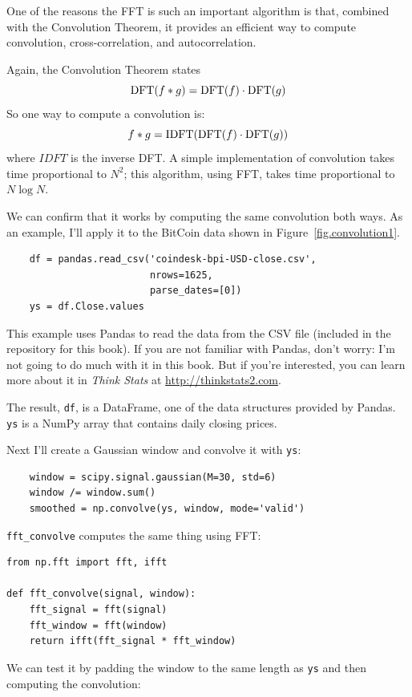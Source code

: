 \documentclass[12pt]{book}
\begin{document}
One of the reasons the FFT is such an important algorithm is that,
combined with the Convolution Theorem, it provides an efficient
way to compute convolution, cross-correlation, and autocorrelation.

Again, the Convolution Theorem states
%
\[ \mathrm{DFT}(f \ast g) = \mathrm{DFT}(f) \cdot \mathrm{DFT}(g) \]
%
So one way to compute a convolution is:
%
\[ f \ast g = \mathrm{IDFT}(\mathrm{DFT}(f) \cdot \mathrm{DFT}(g)) \]
%
where $IDFT$ is the inverse DFT.  A simple implementation of
convolution takes time proportional to $N^2$; this algorithm,
using FFT, takes time proportional to $N \log N$.

We can confirm that it works by computing the same convolution
both ways.  As an example, I'll apply it to the BitCoin data
shown in Figure~\ref{fig.convolution1}.

\begin{verbatim}
    df = pandas.read_csv('coindesk-bpi-USD-close.csv', 
                         nrows=1625, 
                         parse_dates=[0])
    ys = df.Close.values
\end{verbatim}

This example uses Pandas to read the data from the CSV file (included
in the repository for this book).  If you are not familiar with
Pandas, don't worry: I'm not going to do much with it in this book.
But if you're interested, you can learn more about it in
{\it Think Stats} at \url{http://thinkstats2.com}.

The result, {\tt df}, is a DataFrame, one of the data structures
provided by Pandas.  {\tt ys} is a NumPy array that contains daily
closing prices.

Next I'll create a Gaussian window and convolve it with {\tt ys}:

\begin{verbatim}
    window = scipy.signal.gaussian(M=30, std=6)
    window /= window.sum()
    smoothed = np.convolve(ys, window, mode='valid')
\end{verbatim}

\verb"fft_convolve" computes the same thing using FFT:

\begin{verbatim}
from np.fft import fft, ifft

def fft_convolve(signal, window):
    fft_signal = fft(signal)
    fft_window = fft(window)
    return ifft(fft_signal * fft_window)
\end{verbatim}

We can test it by padding the window to the same length
as {\tt ys} and then computing the convolution:
\end{document}
